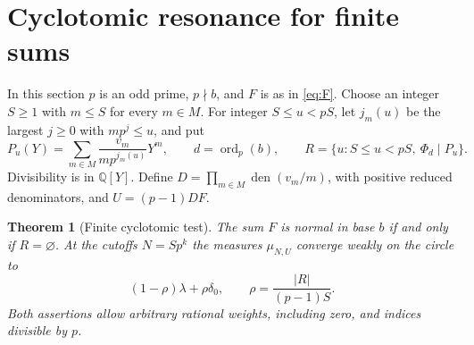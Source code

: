 \documentclass[11pt]{article}
\newtheorem{theorem}{Theorem}
\newcommand{\Q}{\mathbb Q}
\newcommand{\den}{\operatorname{den}}
\newcommand{\ord}{\operatorname{ord}}
\begin{document}
\section{Cyclotomic resonance for finite sums}\label{sec:finite}
In this section \(p\) is an odd prime, \(p\nmid b\), and \(F\) is as in \eqref{eq:F}. Choose an integer \(S\ge1\) with \(m\le S\) for every \(m\in M\). For integer \(S\le u<pS\), let \(j_m(u)\) be the largest \(j\ge0\) with \(mp^j\le u\), and put
\[
 P_u(Y)=\sum_{m\in M}\frac{v_m}{mp^{j_m(u)}}Y^m,\qquad
 d=\ord_p(b),\qquad R=\{u:S\le u<pS,\ \Phi_d\mid P_u\}.
\]
Divisibility is in \(\Q[Y]\). Define \(D=\prod_{m\in M}\den(v_m/m)\), with positive reduced denominators, and \(U=(p-1)DF\).

\begin{theorem}[Finite cyclotomic test]\label{th:cyclo}
The sum \(F\) is normal in base \(b\) if and only if \(R=\varnothing\). At the cutoffs \(N=Sp^k\) the measures \(\mu_{N,U}\) converge weakly on the circle to
\[
 (1-\rho)\lambda+\rho\delta_0,\qquad \rho=\frac{|R|}{(p-1)S}.
\]
Both assertions allow arbitrary rational weights, including zero, and indices divisible by \(p\).
\end{theorem}
\end{document}
